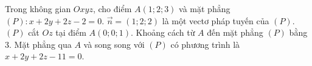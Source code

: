\begin{ex}
Trong không gian $Oxyz$, cho điểm $A(1;2;3)$ và mặt phẳng $(P)\colon x+2y+2z-2=0$.
\choiceTF
{\True $\vec n=(1;2;2)$ là một vectơ pháp tuyến của $(P)$.}
{\True $(P)$ cắt $Oz$ tại điểm $A(0;0;1)$.}
{\True Khoảng cách từ $A$ đến mặt phẳng $(P)$ bằng $3$.}
{\True Mặt phẳng qua $A$ và song song với $(P)$ có phương trình là $x+2y+2z-11=0$.}
\end{ex}

